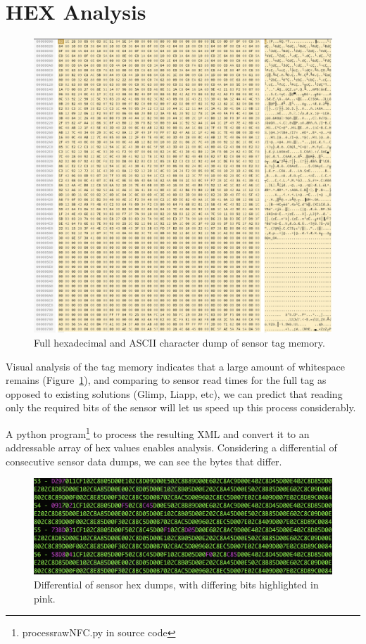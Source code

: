 \section{HEX Analysis}

\begin{figure}[ht]
\centering\includegraphics[width=0.5\linewidth]{images/hexdump.png}
\caption{Full hexadecimal and ASCII character dump of sensor tag memory.}
\label{fig:hexdump}
\end{figure}

Visual analysis of the tag memory indicates that a large amount of whitespace remains (Figure~\ref{fig:hexdump}), and comparing to sensor read times for the full tag as opposed to existing solutions (Glimp, Liapp, etc), we can predict that reading only the required bits of the sensor will let us speed up this process considerably.

A python program\footnote{processrawNFC.py in source code} to process the resulting XML and convert it to an addressable array of hex values enables analysis. Considering a differential of consecutive sensor data dumps, we can see the bytes that differ. 

\begin{figure}[ht]
\centering\includegraphics[width=1.0\linewidth]{images/diff.png}
\caption{Differential of sensor hex dumps, with differing bits highlighted in pink.}
\label{fig:diff}
\end{figure}

